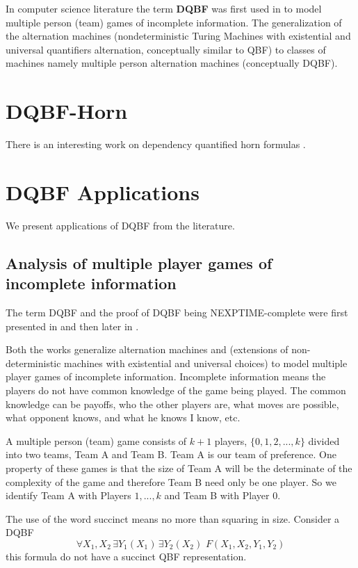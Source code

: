 \documentclass[runningheads]{llncs}
\begin{document}
In computer science literature the term \textbf{DQBF} was first used in \cite{peterson1979multiple} to model multiple person (team) games of incomplete information.
The generalization of the alternation machines (nondeterministic Turing Machines with existential and universal quantifiers alternation, conceptually similar to QBF) to classes of machines namely multiple person alternation machines (conceptually DQBF).

\section{DQBF-Horn}\label{sec:dqbf-horn}
There is an interesting work on dependency quantified horn formulas \cite{bubeckb06}.

\section{DQBF Applications}\label{sec:dqbf-applications}

We present applications of DQBF from the literature.

\subsection{Analysis of multiple player games of incomplete information}\label{subsec:multiplayer-games}

The term DQBF and the proof of DQBF being NEXPTIME-complete were first presented in \cite{peterson1979multiple} and then later in \cite{peterson2001lower}.

Both the works generalize alternation machines \cite{chandra1981lj} and \cite{fraenkel78} (extensions of non-deterministic machines with existential and universal choices) to model multiple player games of incomplete information.
Incomplete information means the players do not have common knowledge of the game being played.
The common knowledge can be payoffs, who the other players are, what moves are possible, what opponent knows, and what he knows I know, etc.

A multiple person (team) game consists of $k+1$ players, $\{0, 1,2, ... ,k\}$ divided into two teams, Team A and Team B.
Team A is our team of preference.
One property of these games is that the size of Team A will be the determinate of the complexity of the game and therefore Team B need only be one player.
So we identify Team A with Players $1,...,k$ and Team B with Player 0.

The use of the word succinct means no more than squaring in size. Consider a DQBF
\[
\forall X_1,X_2 \, \exists Y_1(X_1) \, \exists Y_2(X_2) \,\, F (X_1, X_2, Y_1, Y_2)
\]
this formula do not have a succinct QBF representation.
\end{document}
